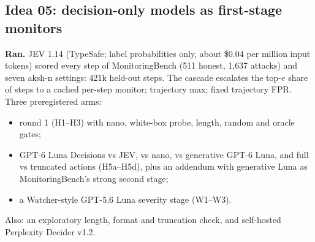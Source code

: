 \documentclass[11pt]{article}
\begin{document}
\subsection{Idea 05: decision-only models as first-stage monitors}
\textbf{Ran.} JEV 1.14 (TypeSafe; label probabilities only, about \$0.04 per million input tokens) scored every step of MonitoringBench (511 honest, 1{,}637 attacks) and seven aksh-n settings: 421k held-out steps. The cascade escalates the top-$e$ share of steps to a cached per-step monitor; trajectory max; fixed trajectory FPR. Three preregistered arms:
\begin{itemize}
\item round 1 (H1--H3) with nano, white-box probe, length, random and oracle gates;
\item GPT-6 Luna Decisions vs JEV, vs nano, vs generative GPT-6 Luna, and full vs truncated actions (H5a--H5d), plus an addendum with generative Luna as MonitoringBench's strong second stage;
\item a Watcher-style GPT-5.6 Luna severity stage (W1--W3).
\end{itemize}
Also: an exploratory length, format and truncation check, and self-hosted Perplexity Decider v1.2.
\end{document}
